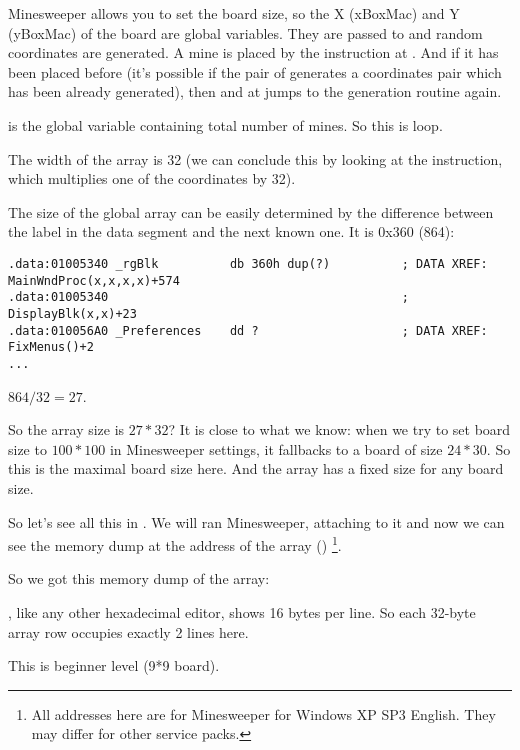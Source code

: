 Minesweeper allows you to set the board size, so the X (xBoxMac) and Y (yBoxMac) of the board are global variables.
They are passed to  and random 
coordinates are generated.
A mine is placed by the  instruction at . 
And if it has been placed before 
(it's possible if the pair of  
generates a coordinates pair which has been already 
generated), 
then  and  at  
jumps to the generation routine again.

 is the global variable containing total number of mines. So this is loop.

The width of the array is 32 
(we can conclude this by looking at the  instruction, which multiplies one of the coordinates by 32).

The size of the  
global array can be easily determined by the difference 
between the  
label in the data segment and the next known one. 
It is 0x360 (864):

\begin{lstlisting}[style=customasmx86]
.data:01005340 _rgBlk          db 360h dup(?)          ; DATA XREF: MainWndProc(x,x,x,x)+574
.data:01005340                                         ; DisplayBlk(x,x)+23
.data:010056A0 _Preferences    dd ?                    ; DATA XREF: FixMenus()+2
...
\end{lstlisting}

$864/32=27$.

So the array size is $27*32$?
It is close to what we know: when we try to set board size to $100*100$ in Minesweeper settings, it fallbacks to a board of size $24*30$.
So this is the maximal board size here.
And the array has a fixed size for any board size.

So let's see all this in \olly.
We will ran Minesweeper, attaching \olly to it and now we can see the memory dump at the address of the  array ()
\footnote{All addresses here are for Minesweeper for Windows XP SP3 English. 
They may differ for other service packs.}.

So we got this memory dump of the array:



\olly, like any other hexadecimal editor, shows 16 bytes per line.
So each 32-byte array row occupies exactly 2 lines here.

This is beginner level (9*9 board).

